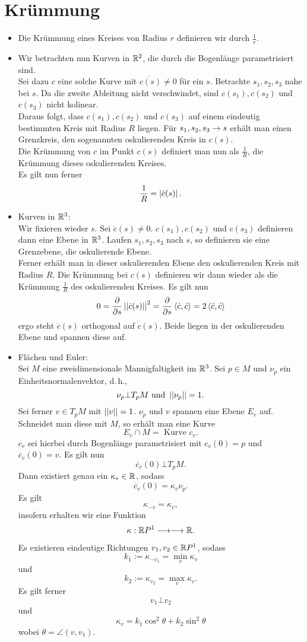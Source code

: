 \newpage
\section{Krümmung}
\Bsp{}
\begin{itemize}
	\item Die Krümmung eines Kreises von Radius $r$ definieren wir durch $\frac{1}{r}$.
	\item Wir betrachten nun Kurven in $\mathbb{R}^2$, die durch die Bogenlänge parametrisiert sind.\\
	Sei dazu $c$ eine solche Kurve mit $\ddot{c(s)} \neq 0$ für ein $s$. Betrachte $s_1, s_2, s_3$ nahe bei $s$. Da die zweite Ableitung nicht verschwindet, sind $c(s_1), c(s_2)$ und $c(s_3)$ nicht kolinear.\\
	Daraus folgt, dass $c(s_1), c(s_2)$ und $c(s_3)$ auf einem eindeutig bestimmten Kreis mit Radius $R$ liegen. Für $s_1, s_2, s_3 \overset{}{\rightarrow} s$ erhält man einen Grenzkreis, den sogenannten oskulierenden Kreis in $c(s)$.\\
	Die Krümmung von $c$ im Punkt $c(s)$ definiert man nun als $\frac{1}{R}$, die Krümmung dieses oskulierenden Kreises.\\
	Es gilt nun ferner
	\[ \frac{1}{R} = \left|\ddot{c}(s)\right|. \]
	\item Kurven in $\mathbb{R}^3$:\\
	Wir fixieren wieder $s$. Sei $\ddot{c}(s) \neq 0$. $c(s_1), c(s_2)$ und $c(s_3)$ definieren dann eine Ebene in $\mathbb{R}^3$. Laufen $s_1, s_2, s_3$ nach $s$, so definieren sie eine Grenzebene, die oskulierende Ebene.\\
	Ferner erhält man in dieser oskulierenden Ebene den oskulierenden Kreis mit Radius $R$. Die Krümmung bei $c(s)$ definieren wir dann wieder als die Krümmung $\frac{1}{R}$ des oskulierenden Kreises. Es gilt nun
	\[ 0 = \frac{\partial }{\partial s} \left|\left|\dot{c}(s)\right|\right|^2 = \frac{\partial }{\partial s}\left<\dot{c}, \dot{c}\right> = 2\left<\ddot{c}, \dot{c}\right> \]
	ergo steht $\ddot{c}(s)$ orthogonal auf $\dot{c}(s)$. Beide liegen in der oskulierenden Ebene und spannen diese auf.
	\item Flächen und Euler:\\
	Sei $M$ eine zweidimensionale Mannigfaltigkeit im $\mathbb{R}^3$. Sei $p \in M$ und $\nu_p$ ein Einheitsnormalenvektor, d.\,h.,
	\[ \nu_p \bot T_pM \text{ und } \left|\left|\nu_p\right|\right| = 1. \]
	Sei ferner $v \in T_pM$ mit $\left|\left|v\right|\right| = 1$. $\nu_p$ und $v$ spannen eine Ebene $E_v$ auf. Schneidet man diese mit $M$, so erhält man eine Kurve
	\[ E_v\cap M = \text{ Kurve }c_v. \]
	$c_v$ sei hierbei durch Bogenlänge parametrisiert mit $c_v(0) = p$ und $\dot{c_v}(0) = v$. Es gilt nun
	\[ \ddot{c_v}(0) \bot T_pM. \]
	Dann existiert genau ein $\kappa_v \in \mathbb{R}$, sodass
	\[ \ddot{c_v}(0) = \kappa_v \nu_p. \]
	Es gilt
	\[ \kappa_{-v} = \kappa_v, \]
	insofern erhalten wir eine Funktion
	\[ \kappa : \mathbb{R} P^1 \overset{}{\longrightarrow} \overset{}{\longrightarrow} \mathbb{R}. \]
	
	Es existieren eindeutige Richtungen $v_1,v_2 \in \mathbb{R} P^1$, sodass
	\[ k_1 := \kappa_{-v_1} = \min_v \kappa_v \]
	und
	\[ k_2 := \kappa_{v_2} = \max_v\kappa_v. \]
	Es gilt ferner
	\[v_1 \bot v_2\]
	und
	\[ \kappa_v = k_1 \cos^2\theta + k_2 \sin^2\theta \]
	wobei $\theta = \angle (v, v_1)$.	 
	
\end{itemize}


